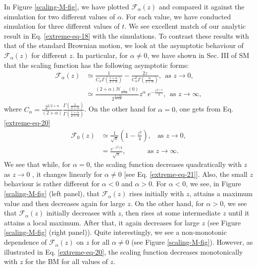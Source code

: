 \documentclass[showpacs,amsmath,amssymb,aps,pre,twocolumn,]{revtex4-1}
\begin{document}
In Figure \ref{scaling-M-fig}, we have plotted $\mathcal{F}_{\alpha}(z)$ and compared it against the simulation for two different values of $\alpha$. For each value, we have conducted simulation for three different values of $t$. We see excellent match of our analytic result in Eq. \eqref{extreme-eq-18} with the simulations. To contrast these results with that of the standard Brownian motion, we look at the asymptotic behaviour of $\mathcal{F}_{\alpha}(z)$ for different $z$. In particular, for $\alpha \neq 0$, we have shown in Sec. III of SM \cite{Supplementary} that the scaling function has the following asymptotic forms:
\begin{align}
\mathcal{F}_{\alpha}(z) &\simeq \frac{1}{C_{\alpha} \Gamma \left( \frac{1+\alpha}{2+\alpha}\right)}-\frac{2z}{C_{\alpha} ^2 \Gamma\left( \frac{\alpha}{2+\alpha}\right)},~~\text{as } z \to 0, \label{extreme-eq-21} \\
&\simeq \frac{(2+\alpha)\mathcal{H}_{\frac{1}{2+\alpha}}(0) }{2^{\frac{3+2\alpha}{2+\alpha}}}  z^{\alpha} ~e^{-\frac{z^{2+\alpha}}{4} },~~\text{as } z \to \infty,
\label{extreme-eq-22}
\end{align}
where $C_{\alpha} = \frac{2^{2/2+\alpha}}{(2+\alpha)} \frac{\Gamma \left( \frac{1}{2+\alpha}\right)}{\Gamma \left( \frac{1+\alpha}{2+\alpha}\right)}$. On the other hand for $\alpha =0$, one gets from Eq. \eqref{extreme-eq-20}
\begin{align}
\mathcal{F}_{0}(z) &\simeq \frac{1}{\sqrt{\pi}} \left( 1-\frac{z^2}{4}\right), ~~~~\text{as } z \to 0, \label{extreme-eq-22-new}\\
& = \frac{e^{-z^2/4}}{\sqrt{\pi}},~~~~~~~~~~~~~~\text{as } z \to \infty. \label{extreme-eq-23-new}
\end{align}
We see that while, for $\alpha =0$, the scaling function decreases quadratically with $z$ as $z \to 0$ , it changes linearly for $\alpha \neq 0$ [see Eq. \eqref{extreme-eq-21}]. Also, the small $z$ behaviour is rather different for $\alpha <0$ and $\alpha >0$. For $\alpha <0$, we see, in Figure \ref{scaling-M-fig} (left panel), that $\mathcal{F}_{\alpha}(z)$ rises initially with $z$, attains a maximum value and then decreases again for large $z$. On the other hand, for $\alpha >0$, we see that $\mathcal{F}_{\alpha}(z)$ initially decreases with $z$, then rises at some intermediate $z$ until it attains a local maximum. After that, it again decreases for large $z$ (see Figure \ref{scaling-M-fig} (right panel)). Quite interestingly, we see a non-monotonic dependence of $\mathcal{F}_{\alpha}(z)$ on $z$ for all $\alpha \neq 0$ (see Figure \ref{scaling-M-fig}). However, as illustrated in Eq. \eqref{extreme-eq-20}, the scaling function decreases monotonically with $z$ for the BM for all values of $z$.
\end{document}
